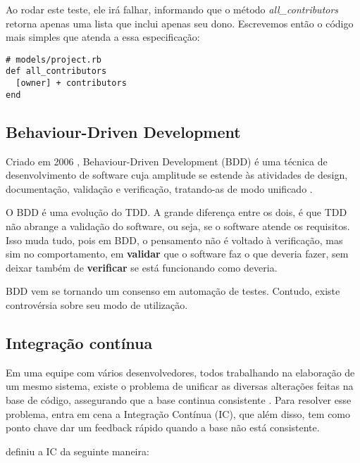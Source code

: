 Ao rodar este teste, ele irá falhar, informando que o método \textit{all\_contributors} retorna apenas uma lista que inclui apenas seu dono. Escrevemos então o código mais simples que atenda a essa especificação:

\begin{lstlisting}[caption=Implementação para todos contribuidores de um projeto,label=code:implement_all_contributors2]
# models/project.rb
def all_contributors
  [owner] + contributors
end
\end{lstlisting}

% 


\subsection{Behaviour-Driven Development}

Criado em 2006 \cite{IntroducingBDD}, Behaviour-Driven Development (BDD) é uma técnica de desenvolvimento de software cuja amplitude se estende às atividades de design, documentação, validação e verificação, tratando-as de modo unificado \cite{BDDRodrigo}.

O BDD é uma evolução do TDD. A grande diferença entre os dois, é que TDD não abrange a validação do software, ou seja, se o software atende os requisitos. Isso muda tudo, pois em BDD, o pensamento não é voltado à verificação, mas sim no comportamento, em \textbf{validar} que o software faz o que deveria fazer, sem deixar também de \textbf{verificar} se está funcionando como deveria.

BDD vem se tornando um consenso em automação de testes. Contudo, existe controvérsia sobre seu modo de utilização.


\subsection{Integração contínua}

Em uma equipe com vários desenvolvedores, todos trabalhando na elaboração de um mesmo sistema, existe o problema de unificar as diversas alterações feitas na base de código, assegurando que a base continua consistente \cite{ImproveitCI}. Para resolver esse problema, entra em cena a Integração Contínua (IC), que além disso, tem como ponto chave dar um feedback rápido quando a base não está consistente.

\cite{FowlerCI} definiu a IC da seguinte maneira:

